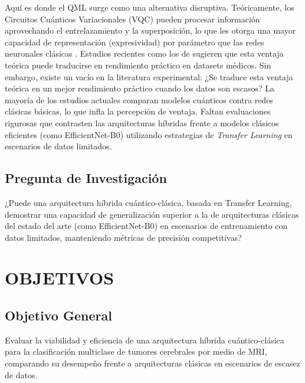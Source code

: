 \documentclass[12pt,letterpaper]{article}
\begin{document}
    Aquí es donde el QML surge como una alternativa disruptiva.
    Teóricamente, los Circuitos Cuánticos Variacionales (VQC) pueden procesar información aprovechando el entrelazamiento y la superposición, lo que les otorga una mayor capacidad de representación (expresividad) por parámetro que las redes neuronales clásicas \citep{schuld2019feature}.
    Estudios recientes como los de \citet{shahjalal2025hqcnn} sugieren que esta ventaja teórica puede traducirse en rendimiento práctico en datasets médicos.
    Sin embargo, existe un vacío en la literatura experimental: ¿Se traduce esta ventaja teórica en un mejor rendimiento práctico cuando los datos son escasos?
    La mayoría de los estudios actuales comparan modelos cuánticos contra redes clásicas básicas, lo que infla la percepción de ventaja.
    Faltan evaluaciones rigurosas que contrasten las arquitecturas híbridas frente a modelos clásicos eficientes (como EfficientNet-B0) utilizando estrategias de \textit{Transfer Learning} en escenarios de datos limitados.

    \subsection{Pregunta de Investigación}
    \vspace{-0.5cm}
    ¿Puede una arquitectura híbrida cuántico-clásica, basada en Transfer Learning, demostrar una capacidad de generalización superior a la de arquitecturas clásicas del estado del arte (como EfficientNet-B0) en escenarios de entrenamiento con datos limitados, manteniendo métricas de precisión competitivas?

    \newpage
    \section{OBJETIVOS}
    \vspace{-0.5cm}

    \subsection{Objetivo General}
    \vspace{-0.5cm}
    Evaluar la viabilidad y eficiencia de una arquitectura híbrida cuántico-clásica para la clasificación multiclase de tumores cerebrales por medio de MRI, comparando su desempeño frente a arquitecturas clásicas en escenarios de escasez de datos.
\end{document}
